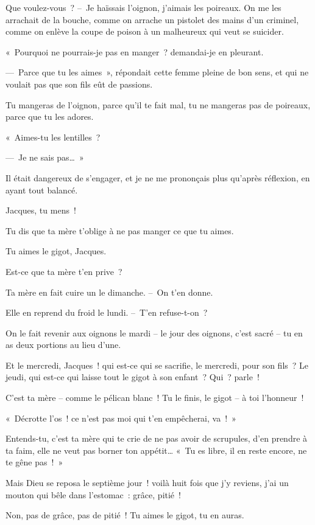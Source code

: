 \documentclass[french,twoside]{book} %
\begin{document}
Que voulez-vous ? – Je haïssais l’oignon, j’aimais les poireaux. On me les arrachait de la bouche, comme on arrache un pistolet des mains d’un criminel, comme on enlève la coupe de poison à un malheureux qui veut se suicider.\par
« Pourquoi ne pourrais-je pas en manger ? demandai-je en pleurant.\par
— Parce que tu les aimes », répondait cette femme pleine de bon sens, et qui ne voulait pas que son fils eût de passions.\par
Tu mangeras de l’oignon, parce qu’il te fait mal, tu ne mangeras pas de poireaux, parce que tu les adores.\par
« Aimes-tu les lentilles ?\par
— Je ne sais pas… »\par
Il était dangereux de s’engager, et je ne me prononçais plus qu’après réflexion, en ayant tout balancé.\par
Jacques, tu mens !\par
Tu dis que ta mère t’oblige à ne pas manger ce que tu aimes.\par
Tu aimes le gigot, Jacques.\par
Est-ce que ta mère t’en prive ?\par
Ta mère en fait cuire un le dimanche. – On t’en donne.\par
Elle en reprend du froid le lundi. – T’en refuse-t-on ?\par
On le fait revenir aux oignons le mardi – le jour des oignons, c’est sacré – tu en as deux portions au lieu d’une.\par
Et le mercredi, Jacques ! qui est-ce qui se sacrifie, le mercredi, pour son fils ? Le jeudi, qui est-ce qui laisse tout le gigot à son enfant ? Qui ? parle !\par
C’est ta mère – comme le pélican blanc ! Tu le finis, le gigot – à toi l’honneur !\par
« Décrotte l’os ! ce n’est pas moi qui t’en empêcherai, va ! »\par
Entends-tu, c’est ta mère qui te crie de ne pas avoir de scrupules, d’en prendre à ta faim, elle ne veut pas borner ton appétit… « Tu es libre, il en reste encore, ne te gêne pas ! »\par
Mais Dieu se reposa le septième jour ! voilà huit fois que j’y reviens, j’ai un mouton qui bêle dans l’estomac : grâce, pitié !\par
Non, pas de grâce, pas de pitié ! Tu aimes le gigot, tu en auras.\par
\end{document}
